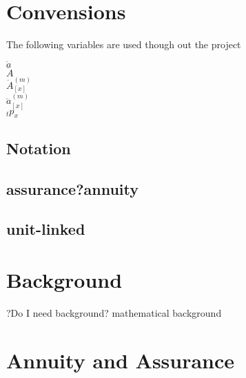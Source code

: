 \documentclass{report}
\begin{document}
\chapter*{Convensions}

The following variables are used though out the project

$\ddot{a}$\\
$\ddot{A}$\\
$\ddot{A}^{(m)}_{[x]}$\\
$\ddot{a}^{(m)}_{[x]}$\\
$_t p_x$\\

\section*{Notation}
















\section*{assurance?annuity}

\section*{unit-linked}











\chapter*{Background}



?Do I need background? mathematical background








\chapter{Annuity and Assurance}    \label{annuity}
\end{document}
